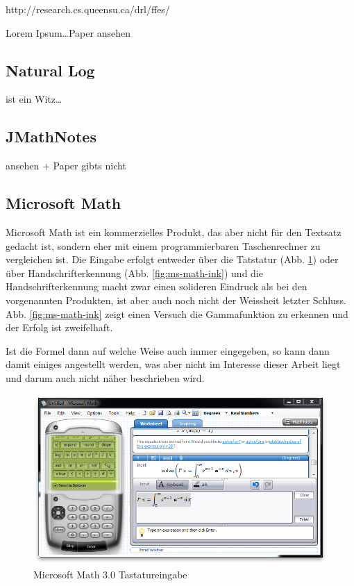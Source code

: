 http://research.cs.queensu.ca/drl/ffes/

Lorem Ipsum\dots \TODO Paper ansehen

\subsection{Natural Log}

\TODO ist ein Witz\dots 

\subsection{JMathNotes}

\TODO ansehen + Paper gibts nicht

\subsection{Microsoft Math}

Microsoft Math ist ein kommerzielles Produkt, das aber nicht für den Textsatz gedacht ist, sondern eher mit einem programmierbaren Taschenrechner zu vergleichen ist. Die Eingabe erfolgt entweder über die Tatstatur (Abb. \ref{fig:ms-math-keyboard}) oder über Handschrifterkennung (Abb. \ref{fig:ms-math-ink}) und die Handschrifterkennung macht zwar einen solideren Eindruck als bei den vorgenannten Produkten, ist aber auch noch nicht der Weissheit letzter Schluss. Abb. \ref{fig:ms-math-ink} zeigt einen Versuch die Gammafunktion zu erkennen und der Erfolg ist zweifelhaft.

Ist die Formel dann auf welche Weise auch immer eingegeben, so kann dann damit einiges angestellt werden, was aber nicht im Interesse dieser Arbeit liegt und darum auch nicht näher beschrieben wird.

\begin{figure}
  \begin{center}
    \includegraphics[width=\textwidth]{figures/ms-math-keyboard.png}
  \end{center}
  \caption{Microsoft Math 3.0 Tastatureingabe}
  \label{fig:ms-math-keyboard}
\end{figure}

